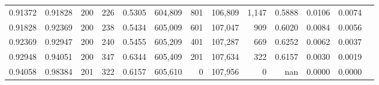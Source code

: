 \begin{tabular}{rrrrrrrrrrrrr}
0.91372 & 0.91828 &   200 & 226 &                                     0.5305 & 604,809 &     801 & 106,809 &   1,147 & 0.5888 & 0.0106 & 0.0074 \\
0.91828 & 0.92369 &   200 & 238 &                                     0.5434 & 605,009 &     601 & 107,047 &     909 & 0.6020 & 0.0084 & 0.0056 \\
0.92369 & 0.92947 &   200 & 240 &                                     0.5455 & 605,209 &     401 & 107,287 &     669 & 0.6252 & 0.0062 & 0.0037 \\
0.92948 & 0.94051 &   200 & 347 &                                     0.6344 & 605,409 &     201 & 107,634 &     322 & 0.6157 & 0.0030 & 0.0019 \\
0.94058 & 0.98384 &   201 & 322 &                                     0.6157 & 605,610 &       0 & 107,956 &       0 &    nan & 0.0000 & 0.0000 \\
\bottomrule
\end{tabular}
